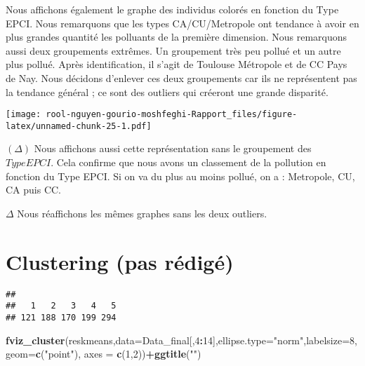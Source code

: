 \documentclass[
]{article}
\newenvironment{Shaded}{\begin{snugshade}}{\end{snugshade}}
\newcommand{\AttributeTok}[1]{\textcolor[rgb]{0.13,0.29,0.53}{#1}}
\newcommand{\DecValTok}[1]{\textcolor[rgb]{0.00,0.00,0.81}{#1}}
\newcommand{\FunctionTok}[1]{\textcolor[rgb]{0.13,0.29,0.53}{\textbf{#1}}}
\newcommand{\NormalTok}[1]{#1}
\newcommand{\OtherTok}[1]{\textcolor[rgb]{0.56,0.35,0.01}{#1}}
\newcommand{\SpecialCharTok}[1]{\textcolor[rgb]{0.81,0.36,0.00}{\textbf{#1}}}
\newcommand{\StringTok}[1]{\textcolor[rgb]{0.31,0.60,0.02}{#1}}
\begin{document}
Nous affichons également le graphe des individus colorés en fonction du
Type EPCI. Nous remarquons que les types CA/CU/Metropole ont tendance à
avoir en plus grandes quantité les polluants de la première dimension.
Nous remarquons aussi deux groupements extrêmes. Un groupement très peu
pollué et un autre plus pollué. Après identification, il s'agit de
Toulouse Métropole et de CC Pays de Nay. Nous décidons d'enlever ces
deux groupements car ils ne représentent pas la tendance général ; ce
sont des outliers qui créeront une grande disparité.

\texttt{[image: rool-nguyen-gourio-moshfeghi-Rapport\_files/figure-latex/unnamed-chunk-25-1.pdf]}

\((\Delta)\) Nous affichons aussi cette représentation sans le
groupement des \(TypeEPCI\). Cela confirme que nous avons un classement
de la pollution en fonction du Type EPCI. Si on va du plus au moins
pollué, on a : Metropole, CU, CA puis CC.

\(\Delta\) Nous réaffichons les mêmes graphes sans les deux outliers.

\hypertarget{clustering-pas-ruxe9diguxe9}{%
\section{Clustering (pas rédigé)}\label{clustering-pas-ruxe9diguxe9}}

\begin{Shaded}
\end{Shaded}

\begin{verbatim}
## 
##   1   2   3   4   5 
## 121 188 170 199 294
\end{verbatim}

\begin{Shaded}
\begin{Highlighting}[]
\FunctionTok{fviz\_cluster}\NormalTok{(reskmeans,}\AttributeTok{data=}\NormalTok{Data\_final[,}\DecValTok{4}\SpecialCharTok{:}\DecValTok{14}\NormalTok{],}\AttributeTok{ellipse.type=}\StringTok{"norm"}\NormalTok{,}\AttributeTok{labelsize=}\DecValTok{8}\NormalTok{,}\AttributeTok{geom=}\FunctionTok{c}\NormalTok{(}\StringTok{"point"}\NormalTok{), }\AttributeTok{axes =} \FunctionTok{c}\NormalTok{(}\DecValTok{1}\NormalTok{,}\DecValTok{2}\NormalTok{))}\SpecialCharTok{+}\FunctionTok{ggtitle}\NormalTok{(}\StringTok{""}\NormalTok{)}
\end{Highlighting}
\end{Shaded}
\end{document}
